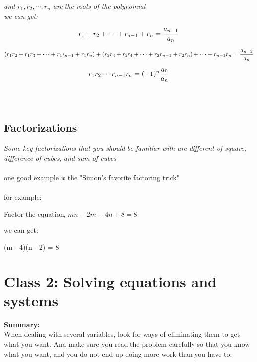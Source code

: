 \documentclass{article}
\begin{document}
\textit{and $r_1, r_2, \cdots, r_n$ are the roots of the polynomial}
\\
\textit{we can get:}

\begin{equation}
	r_1 + r_2 + \cdots + r_{n - 1} + r_n = {a_{n - 1} \over a_n} \\
\end{equation}

\begin{equation}
	(r_1r_2 + r_1r_3 + \cdots + r_1r_{n-1} + r_1r_n) + (r_2r_3 + r_2r_4 + \cdots + r_2r_{n-1} + r_2r_n) + \cdots + r_{n - 1}r_n  = {a_{n - 2} \over a_n}
\end{equation}

\begin{equation}
	r_1r_2\cdots r_{n-1}r_n = {(-1)^n{a_0 \over a_n}}
\end{equation}
\\\\

\subsection{Factorizations}
\textit{Some key factorizations that you should be familiar with are different of square, difference of cubes, and sum of cubes}
\\\\

one good example is the "Simon's favorite factoring trick"
\\\\
for example:
\\
\begin{center}
Factor the equation, $mn - 2m - 4n + 8 = 8$
\end{center}

we can get:
\begin{center}
	(m - 4)(n - 2) = 8
\end{center}

\newpage

\section{Class 2: Solving equations and systems}
\begin{center}
	\textbf{Summary:}	
	\\
	When dealing with several variables, look for ways of eliminating them to get what you want. And make sure you read the problem carefully so that you know what you want,
	and you do not end up doing more work than you have to. 
\end{center}
\end{document}
